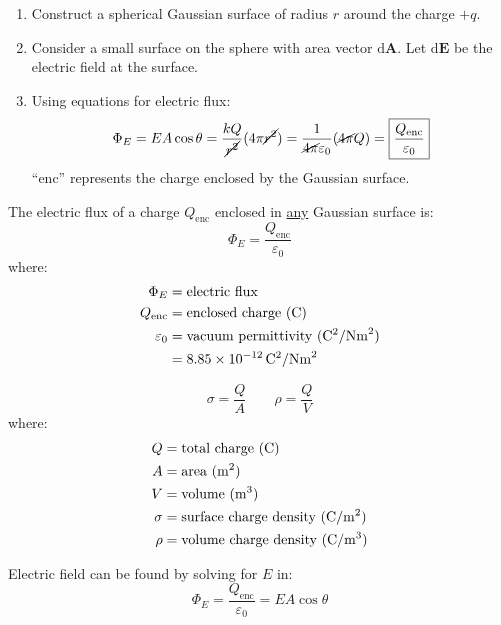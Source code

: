 \documentclass{article}
\newcommand{\theorem}[2]{\begin{tcolorbox}[title={#1},colback=blue!5!white,colframe=blue!75!black,parbox=false] #2 \end{tcolorbox}}
\newcommand{\defitheorem}[2]{\begin{tcolorbox}[title={#1},colback=violet!5!white,colframe=violet!75!black,parbox=false] #2 \end{tcolorbox}}
\begin{document}
\begin{enumerate}
	\item Construct a spherical Gaussian surface of radius $r$ around the charge $+q$.
	\item Consider a small surface on the sphere with area vector $\mathrm{d}\mathbf A$. Let $\mathrm d\mathbf E$ be the electric field at the surface.
	\item Using equations for electric flux:
		\begin{equation*}
		    \Phi_E
			=EA\cos\theta
			=\frac{kQ}{\cancel{r^2}}(4\pi \cancel{r^2})
			=\frac{1}{\cancel{4\pi}\varepsilon_0}(\cancel{4\pi} Q)
			=\boxed{\frac{Q_\text{enc}}{\varepsilon_0}}
		\end{equation*}
		``enc'' represents the charge enclosed by the Gaussian surface.
\end{enumerate}
\theorem{Point charge in Gaussian surface}{
	The electric flux of a charge $Q_\text{enc}$ enclosed in \ul{any} Gaussian surface is:
	\begin{equation*}
		\Phi_E=\frac{Q_\text{enc}}{\varepsilon_0}
	\end{equation*}
	where:
	\begin{align*}
		\Phi_E&=\text{electric flux} \\
		Q_\text{enc}&=\text{enclosed charge (C)} \\
		\varepsilon_0&=\text{vacuum permittivity (\si{C^2/Nm^2})} \\
		&=8.85\times 10^{-12}\,\si{C^2/Nm^2}
	\end{align*}
}

\defitheorem{Surface and volume charge density}{
	\begin{equation*}
	    \sigma=\frac{Q}{A} \qquad
	    \rho=\frac{Q}{V}
	\end{equation*}
	where:
	\begin{align*}
		Q&=\text{total charge (C)} \\
		A&=\text{area (\si{m^2})} \\
		V&=\text{volume (\si{m^3})} \\
		\sigma&=\text{surface charge density (\si{C/m^2})} \\
		\rho&=\text{volume charge density (\si{C/m^3})}
	\end{align*}
}

Electric field can be found by solving for $E$ in:
\begin{equation*}
	\Phi_E=\frac{Q_\text{enc}}{\varepsilon_0}=EA\cos\theta
\end{equation*}
\end{document}
